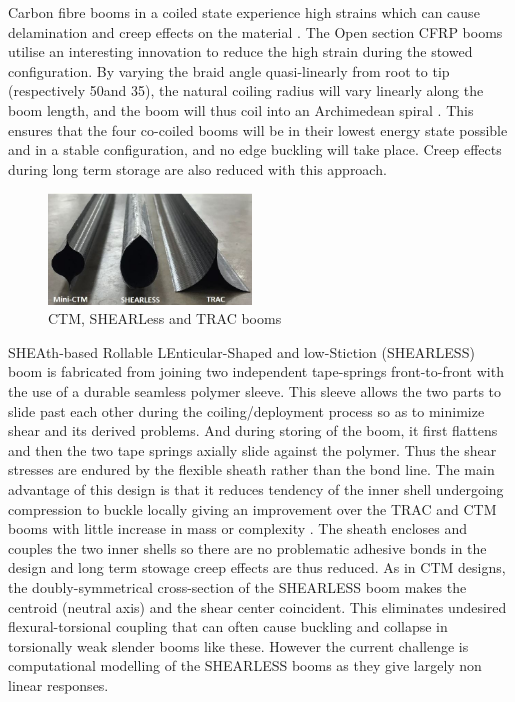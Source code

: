 Carbon fibre booms in a coiled state experience high strains which can cause delamination and creep effects on the material \cite{Fernandez2013}. The Open section CFRP booms utilise an interesting innovation to reduce the high strain during the stowed configuration. By varying the braid angle quasi-linearly from root to tip (respectively 50\degree and 35\degree), the natural coiling radius will vary linearly along the boom length, and the boom will thus coil into an Archimedean spiral \cite{Fernandez2013}. This ensures that the four co-coiled booms will be in their lowest energy state possible and in a stable configuration, and no edge buckling will take place. Creep effects during long term storage are also reduced with this approach. 
\par
\begin{figure}
  \begin{center}
     \includegraphics[width=0.48\textwidth]{images/ctmshearless.JPG}
  \end{center}
  \caption{CTM, SHEARLess and TRAC booms \cite{Fernandez2017}}
  \label{fig:ctm}
\end{figure}
SHEAth-based Rollable LEnticular-Shaped and low-Stiction (SHEARLESS) boom \cite{shear} is fabricated from joining two independent tape-springs front-to-front with the use of a durable seamless polymer sleeve. This sleeve allows the two parts to slide past each other during the coiling/deployment process so as to minimize shear and its derived problems. And during storing of the boom, it first flattens and then the two tape springs axially slide against the polymer. Thus the shear stresses are endured by the flexible sheath rather than the bond line. The main advantage of this design is that it reduces tendency of the inner shell undergoing compression to buckle locally giving an improvement over the TRAC and CTM booms with little increase in mass or complexity \cite{Fernandez2017}. The sheath encloses and couples the two inner shells so there are no problematic adhesive bonds in the design and long term stowage creep effects are thus reduced. As in CTM designs, the doubly-symmetrical cross-section of the SHEARLESS boom makes the centroid (neutral axis) and the shear center coincident. This eliminates undesired flexural-torsional coupling that can often cause buckling and collapse in torsionally weak slender booms like these.\cite{Fernandez2017} However the current challenge is computational modelling of the SHEARLESS booms as they give largely non linear responses.\cite{Fernandez2017}

